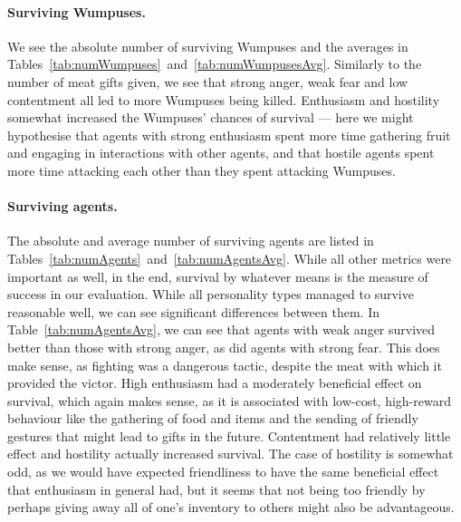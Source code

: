 \paragraph{Surviving Wumpuses.} We see the absolute number of surviving Wumpuses and the averages in Tables~\ref{tab:numWumpuses}~and~\ref{tab:numWumpusesAvg}. Similarly to the number of meat gifts given, we see that strong anger, weak fear and low contentment all led to more Wumpuses being killed. Enthusiasm and hostility somewhat increased the Wumpuses' chances of survival --- here we might hypothesise that agents with strong enthusiasm spent more time gathering fruit and engaging in interactions with other agents, and that hostile agents spent more time attacking each other than they spent attacking Wumpuses.

\paragraph{Surviving agents.} The absolute and average number of surviving agents are listed in Tables~\ref{tab:numAgents}~and~\ref{tab:numAgentsAvg}. While all other metrics were important as well, in the end, survival by whatever means is the measure of success in our evaluation. While all personality types managed to survive reasonable well, we can see significant differences between them. In Table~\ref{tab:numAgentsAvg}, we can see that agents with weak anger survived better than those with strong anger, as did agents with strong fear. This does make sense, as fighting was a dangerous tactic, despite the meat with which it provided the victor. High enthusiasm had a moderately beneficial effect on survival, which again makes sense, as it is associated with low-cost, high-reward behaviour like the gathering of food and items and the sending of friendly gestures that might lead to gifts in the future. Contentment had relatively little effect and hostility actually increased survival. The case of hostility is somewhat odd, as we would have expected friendliness to have the same beneficial effect that enthusiasm in general had, but it seems that not being too friendly by perhaps giving away all of one's inventory to others might also be advantageous.

